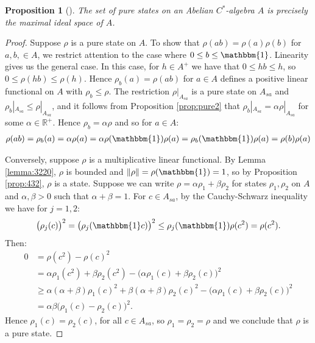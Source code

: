 \documentclass[12pt,a4paper]{report}
\theoremstyle{plain}
\newtheorem{prop}{Proposition}
\theoremstyle{definition}
\newcommand{\1}{\mathbbm{1}}
\newcommand{\R}{\mathbb{R}}
\begin{document}
\begin{prop}[{\cite[4.4.1]{kadison83}}]\label{prop:puremult}
	The set of pure states on an Abelian $C^\ast$-algebra $A$ is precisely the maximal ideal space of 
	$A$.
\end{prop}
\begin{proof}
	Suppose $\rho$ is a pure state on $A$. To show that $\rho(ab)=\rho(a)\rho(b)$ for $a,b,\in A$,
	we restrict attention to the case where $0\leq b\leq\1$. Linearity gives us the general case.
	In this case, for $h\in A^+$ we have that $0\leq hb\leq h$, so $0\leq\rho(hb)\leq\rho(h)$.
	Hence $\rho_b(a)=\rho(ab)$ for $a\in A$ defines a positive linear functional on $A$ with 
	$\rho_b\leq\rho$. The restriction $\rho|_{A_{sa}}$ is a pure state on $A_{sa}$ and 
	$\rho_b|_{A_{sa}} \leq \rho|_{A_{sa}}$, and it follows from Proposition \ref{prop:pure2} that 
	$\rho_b|_{A_{sa}} = \alpha \rho|_{A_{sa}}$ for some $\alpha \in \R^+$.
	Hence $\rho_b = \alpha\rho$  and so for $a\in A$:
	\begin{align*}
		\rho(ab) = \rho_b(a) = \alpha\rho(a) = 
							\alpha\rho(\1)\rho(a) = \rho_b(\1)\rho(a) = \rho(b)\rho(a)
	\end{align*}
	
	Conversely, suppose $\rho$ is a multiplicative linear functional. By Lemma \ref{lemma:3220}, $
	\rho$ is bounded and $\|\rho\|=\rho(\1)=1$, so by Proposition \ref{prop:432}, $\rho$ is a state.
	Suppose we can write $\rho=\alpha\rho_1+\beta\rho_2$ for states $\rho_1,\rho_2$ on $A$ and 
	$\alpha,\beta >0$ such that $\alpha+\beta=1$. For $c\in A_{sa}$, by the Cauchy-Schwarz inequality
	 we have for $j=1,2$:
	\begin{align*}
		\big(\rho_j(c)\big)^2 = \big(\rho_j(\1 c)\big)^2 \leq \rho_j(\1)\rho(c^2)=\rho(c^2).
	\end{align*}
	Then:
	\begin{align*}
				0
		&=		\rho(c^2)-\rho(c)^2 											\\
		&=		\alpha\rho_1(c^2)+\beta\rho_2(c^2) 
						- \big(\alpha\rho_1(c)+\beta\rho_2(c)\big)^2			\\
		&\geq	\alpha(\alpha+\beta)\rho_1(c)^2 
						+ \beta(\alpha+\beta)\rho_2(c)^2
						- \big(\alpha\rho_1(c)+\beta\rho_2(c)\big)^2			\\
		&=		\alpha\beta\big(\rho_1(c) - \rho_2(c)\big)^2.
	\end{align*}
	Hence $\rho_1(c)=\rho_2(c)$, for all $c\in A_{sa}$, so $\rho_1=\rho_2 =\rho$ and we conclude
	that $\rho$ is a pure state. 
\end{proof}
\end{document}
